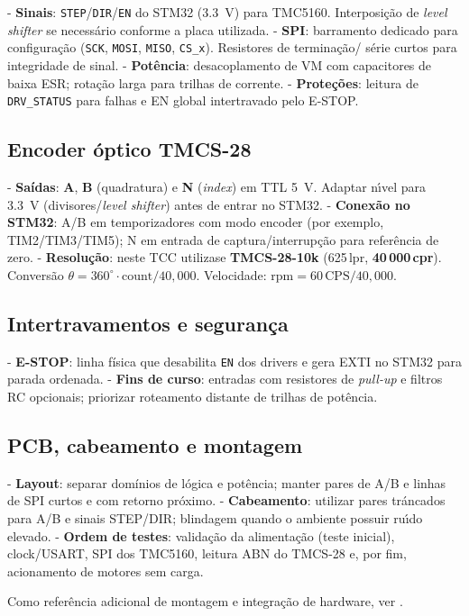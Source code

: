 - \textbf{Sinais}: \texttt{STEP}/\texttt{DIR}/\texttt{EN} do STM32 (\SI{3.3}{V})
  para TMC5160. Interposi\c{c}\~ao de \emph{level shifter} se necess\'ario
  conforme a placa utilizada.
- \textbf{SPI}: barramento dedicado para configura\c{c}\~ao (\texttt{SCK},
  \texttt{MOSI}, \texttt{MISO}, \texttt{CS\_x}). Resistores de termina\c{c}\~ao/
  s\'erie curtos para integridade de sinal.
- \textbf{Pot\^encia}: desacoplamento de VM com capacitores de baixa ESR;
  rota\c{c}\~ao larga para trilhas de corrente.
- \textbf{Prote\c{c}\~oes}: leitura de \texttt{DRV\_STATUS} para falhas e EN
  global intertravado pelo E-STOP.

\subsection{Encoder \'{o}ptico TMCS-28}

- \textbf{Sa\'idas}: \textbf{A}, \textbf{B} (quadratura) e \textbf{N}
  (\emph{index}) em TTL \SI{5}{V}. Adaptar n\'{\i}vel para \SI{3.3}{V}
  (divisores/\emph{level shifter}) antes de entrar no STM32.
- \textbf{Conex\~ao no STM32}: A/B em temporizadores com modo encoder
  (por exemplo, TIM2/TIM3/TIM5); N em entrada de captura/interrup\c{c}\~ao para
  refer\^encia de zero.
- \textbf{Resolu\c{c}\~ao}: neste TCC utiliza\-se \textbf{TMCS-28-10k}
  (625\,lpr, \textbf{40\,000\,cpr}). Convers\~ao \(\theta = 360^{\circ}\cdot
  \text{count}/40{,}000\). Velocidade: \(\text{rpm} = 60\,\text{CPS}/40{,}000\).

\subsection{Intertravamentos e seguran\c{c}a}

- \textbf{E-STOP}: linha f\'isica que desabilita \texttt{EN} dos drivers e
  gera EXTI no STM32 para parada ordenada.
- \textbf{Fins de curso}: entradas com resistores de \emph{pull-up}
  e filtros RC opcionais; priorizar roteamento distante de trilhas de
  pot\^encia.

\subsection{PCB, cabeamento e montagem}

- \textbf{Layout}: separar dom\'inios de l\'ogica e pot\^encia; manter
  pares de A/B e linhas de SPI curtos e com retorno pr\'oximo.
- \textbf{Cabeamento}: utilizar pares tr\'ancados para A/B e sinais STEP/DIR;
  blindagem quando o ambiente possuir ru\'{\i}do elevado.
- \textbf{Ordem de testes}: valida\c{c}\~ao da alimenta\c{c}\~ao (teste inicial),
  clock/USART, SPI dos TMC5160, leitura ABN do TMCS-28 e, por fim,
  acionamento de motores sem carga.

Como refer\^encia adicional de montagem e integra\c{c}\~ao de hardware, ver
\cite{romeros_tcc_ifmg_2022}.
